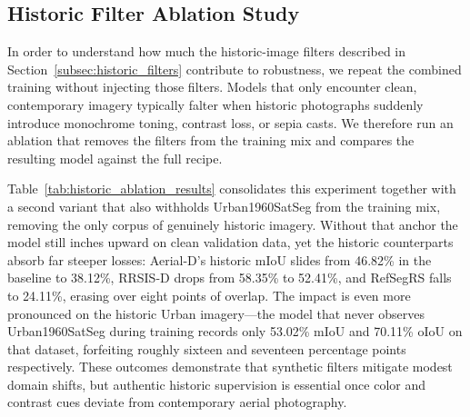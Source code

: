 \subsection{Historic Filter Ablation Study}
\label{subsec:historic_ablation}

In order to understand how much the historic-image filters described in Section~\ref{subsec:historic_filters} contribute to robustness, we repeat the combined training without injecting those filters. Models that only encounter clean, contemporary imagery typically falter when historic photographs suddenly introduce monochrome toning, contrast loss, or sepia casts. We therefore run an ablation that removes the filters from the training mix and compares the resulting model against the full recipe.

Table~\ref{tab:historic_ablation_results} consolidates this experiment together with a second variant that also withholds Urban1960SatSeg from the training mix, removing the only corpus of genuinely historic imagery. Without that anchor the model still inches upward on clean validation data, yet the historic counterparts absorb far steeper losses: Aerial-D's historic mIoU slides from 46.82\% in the baseline to 38.12\%, RRSIS-D drops from 58.35\% to 52.41\%, and RefSegRS falls to 24.11\%, erasing over eight points of overlap. The impact is even more pronounced on the historic Urban imagery—the model that never observes Urban1960SatSeg during training records only 53.02\% mIoU and 70.11\% oIoU on that dataset, forfeiting roughly sixteen and seventeen percentage points respectively. These outcomes demonstrate that synthetic filters mitigate modest domain shifts, but authentic historic supervision is essential once color and contrast cues deviate from contemporary aerial photography.

